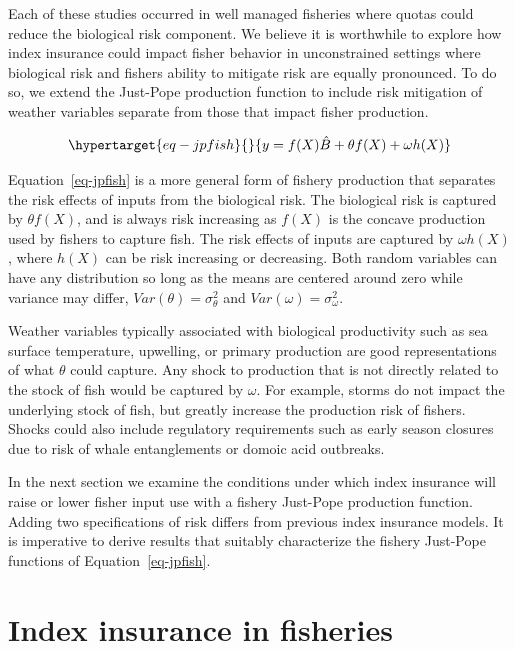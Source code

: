 \documentclass[
  letterpaper,
  DIV=11,
  numbers=noendperiod]{scrartcl}
\theoremstyle{plain}
\theoremstyle{plain}
\theoremstyle{remark}
\begin{document}
Each of these studies occurred in well managed fisheries where quotas
could reduce the biological risk component. We believe it is worthwhile
to explore how index insurance could impact fisher behavior in
unconstrained settings where biological risk and fishers ability to
mitigate risk are equally pronounced. To do so, we extend the Just-Pope
production function to include risk mitigation of weather variables
separate from those that impact fisher production.

\begin{equation}\protect\hypertarget{eq-jpfish}{}{
y=f(X)\hat{B}+\theta f(X)+\omega h(X)
}\label{eq-jpfish}\end{equation}

Equation~\ref{eq-jpfish} is a more general form of fishery production
that separates the risk effects of inputs from the biological risk. The
biological risk is captured by \(\theta f(X)\), and is always risk
increasing as \(f(X)\) is the concave production used by fishers to
capture fish. The risk effects of inputs are captured by
\(\omega h(X)\), where \(h(X)\) can be risk increasing or decreasing.
Both random variables can have any distribution so long as the means are
centered around zero while variance may differ,
\(Var(\theta)=\sigma_\theta^2\) and \(Var(\omega)=\sigma_\omega^2\).

Weather variables typically associated with biological productivity such
as sea surface temperature, upwelling, or primary production are good
representations of what \(\theta\) could capture. Any shock to
production that is not directly related to the stock of fish would be
captured by \(\omega\). For example, storms do not impact the underlying
stock of fish, but greatly increase the production risk of fishers.
Shocks could also include regulatory requirements such as early season
closures due to risk of whale entanglements or domoic acid outbreaks.

In the next section we examine the conditions under which index
insurance will raise or lower fisher input use with a fishery Just-Pope
production function. Adding two specifications of risk differs from
previous index insurance models. It is imperative to derive results that
suitably characterize the fishery Just-Pope functions of
Equation~\ref{eq-jpfish}.

\hypertarget{sec-common}{%
\section{Index insurance in fisheries}\label{sec-common}}
\end{document}
